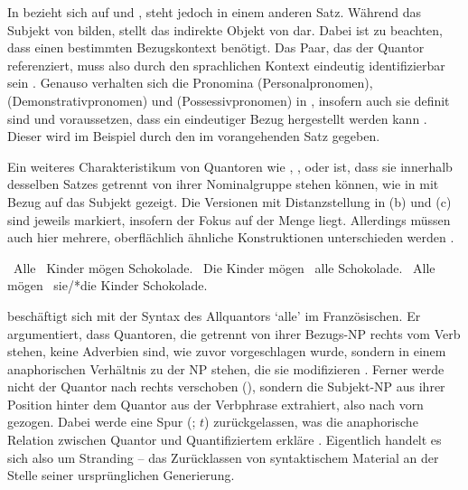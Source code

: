 In  bezieht sich  auf  und ,
steht jedoch in einem anderen Satz. Während  das Subjekt
von  bilden, stellt  das indirekte Objekt von
 dar. Dabei ist zu beachten, dass  einen bestimmten
Bezugskontext benötigt. Das Paar, das der Quantor referenziert, muss also durch
den sprachlichen Kontext eindeutig identifizierbar sein
\autocites[vgl.~z.\,B.][274]{lyons1999}[788]{schwartz2000}[983]{janssen2004}.
Genauso verhalten sich die Pronomina  (Personalpronomen), 
(Demonstrativpronomen) und  (Possessivpronomen) in
, insofern auch sie definit sind und voraussetzen, dass
ein eindeutiger Bezug hergestellt werden kann
\autocites[vgl.][145--148]{lyons1999}. Dieser wird im Beispiel durch den
 im vorangehenden Satz gegeben.

Ein weiteres Charakteristikum von Quantoren wie ,
,  oder  ist, dass sie innerhalb desselben
Satzes getrennt von ihrer Nominalgruppe stehen können, wie in
 mit Bezug auf das Subjekt gezeigt. Die Versionen mit
Distanzstellung in (b) und (c) sind jeweils markiert, insofern der Fokus auf
der Menge liegt. Allerdings müssen auch hier mehrere, oberflächlich ähnliche
Konstruktionen unterschieden werden
\autocites[27--28]{pittner1995}[65--67]{fanselowcavar2002}.

\begin{exe}
\ex \label{ex:floatsubj}
\begin{xlist}
	\ex \label{ex:floatsubj_1}
		{\ob}~Alle {\ob}~Kinder{\cb}{\cb} mögen Schokolade.
	\ex \label{ex:floatsubj_2}
		{\ob}~Die Kinder{\cb} mögen {\ob}~alle{\cb}
		Schokolade.
	\ex \label{ex:floatsubj_3}
		{\ob}~Alle{\cb} mögen {\ob}~sie/*die
		Kinder{\cb} Schokolade.
\end{xlist}
\end{exe}

\citet{sportiche1988} beschäftigt sich mit der Syntax des Allquantors 
`alle' im Französischen. Er argumentiert, dass Quantoren, die
getrennt von ihrer Bezugs-NP rechts vom Verb stehen, keine Adverbien sind, wie
zuvor vorgeschlagen wurde, sondern in einem anaphorischen Verhältnis zu der NP
stehen, die sie modifizieren \autocite[428--433]{sportiche1988}. Ferner werde
nicht der Quantor nach rechts verschoben (), sondern die
Subjekt-NP aus ihrer Position hinter dem Quantor aus der Verbphrase extrahiert,
also nach vorn gezogen. Dabei werde eine Spur (; $t$) zurückgelassen,
was die anaphorische Relation zwischen Quantor und Quantifiziertem erkläre
\autocite[432--433]{sportiche1988}. Eigentlich handelt es sich also um
Stranding -- das Zurücklassen von syntaktischem Material an der Stelle seiner
ursprünglichen Generierung.

